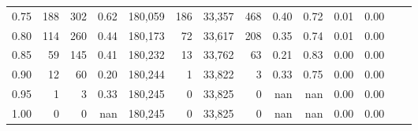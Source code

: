 \begin{tabular}{rrrrrrrrrrrrrr}
0.75 &     188 &    302 &    0.62 &  180,059 &      186 &  33,357 &     468 &  0.40 &  0.72 &  0.01 &      0.00 \\
0.80 &     114 &    260 &    0.44 &  180,173 &       72 &  33,617 &     208 &  0.35 &  0.74 &  0.01 &      0.00 \\
0.85 &      59 &    145 &    0.41 &  180,232 &       13 &  33,762 &      63 &  0.21 &  0.83 &  0.00 &      0.00 \\
0.90 &      12 &     60 &    0.20 &  180,244 &        1 &  33,822 &       3 &  0.33 &  0.75 &  0.00 &      0.00 \\
0.95 &       1 &      3 &    0.33 &  180,245 &        0 &  33,825 &       0 &   nan &   nan &  0.00 &      0.00 \\
1.00 &       0 &      0 &     nan &  180,245 &        0 &  33,825 &       0 &   nan &   nan &  0.00 &      0.00 \\
\bottomrule
\end{tabular}
